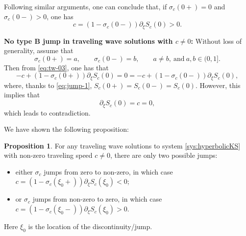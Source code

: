 \documentclass[12pt]{article}
\theoremstyle{definition}
\newtheorem{proposition}[theorem]{Proposition}
\theoremstyle{remark}
\numberwithin{equation}{section}
\begin{document}
Following similar arguments, one can conclude that, if $ \sigma_c(0+) = 0 $ and $ \sigma_c(0-) > 0 $, one has
\begin{equation}
    \label{tw-jump-104}
    c = (1-\sigma_c(0-)) \partial_\xi S_c(0) > 0.
\end{equation}

\smallskip 





{\noindent\bf No type B jump in traveling wave solutions with $ c \neq 0 $:} Without loss of generality, assume that
\begin{equation}
    \label{tw-jump-004}
    \sigma_c(0+) = a, \qquad \sigma_c(0-) = b, \qquad a \neq b, \ \text{and} \  a, b \in (0,1]. 
\end{equation}
Then from \eqref{eq:tw-03}, one has that
\begin{equation}
\label{tw-jump-005}
    -c + (1-\sigma_c(0+)) \partial_\xi S_c(0) = 0 = -c + (1-\sigma_c(0-)) \partial_\xi S_c(0),
\end{equation}
where, thanks to \eqref{eq:jump-1}, $ S_c(0+) = S_c(0-) = S_c(0) $. However, this implies that 
\begin{equation}
   \partial_\xi S_c(0)= c = 0, 
\end{equation}
which leads to contradiction. 

We have shown the following proposition:
\begin{proposition}
    \label{prop:no-jump-tw}
    For any traveling wave solutions to system \eqref{sys:hyperbolicKS} with non-zero traveling speed $ c \neq 0 $, there are only two possible jumps:
    \begin{itemize}
        \item either $ \sigma_c $ jumps from zero to non-zero, in which case $ c = (1-\sigma_c(\xi_0+))\partial_\xi S_c(\xi_0) < 0 $;
        \item or $ \sigma_c $ jumps from non-zero to zero, in which case $ c = (1-\sigma_c(\xi_0-))\partial_\xi S_c(\xi_0) > 0 $.
    \end{itemize} 
    Here $ \xi_0 $ is the location of the discontinuity/jump. 
\end{proposition}

\smallskip 
\end{document}
